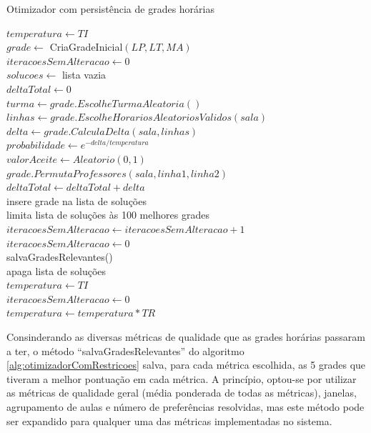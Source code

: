 \begin{algorithm}
	\caption{Otimizador com persistência de grades horárias}
	\label{alg:otimizadorComRestricoes}
	$temperatura \leftarrow TI$\\
	$grade \leftarrow$ CriaGradeInicial$(LP, LT, MA)$\\
	$iteracoesSemAlteracao \leftarrow 0$\\
	$solucoes \leftarrow$ lista vazia\\
	 {
		$deltaTotal \leftarrow 0$\\
		 {
			$turma \leftarrow grade.EscolheTurmaAleatoria()$\\
			$linhas \leftarrow grade.EscolheHorariosAleatoriosValidos(sala)$\\
			$delta \leftarrow grade.CalculaDelta(sala, linhas)$\\
			$probabilidade \leftarrow e^{-delta/temperatura}$\\
			$valorAceite \leftarrow Aleatorio(0, 1)$\\
			 {
				$grade.PermutaProfessores(sala, linha1, linha2)$\\
				$deltaTotal \leftarrow deltaTotal + delta$\\
				 {
					insere grade na lista de soluções\\
					limita lista de soluções às 100 melhores grades\\
				}
			}
		}
		 {
			$iteracoesSemAlteracao \leftarrow iteracoesSemAlteracao + 1$\\
		}{
			$iteracoesSemAlteracao \leftarrow 0$\\
		}
		 {
			salvaGradesRelevantes()\\
			apaga lista de soluções\\
			$temperatura \leftarrow TI$\\
			$iteracoesSemAlteracao \leftarrow 0$\\
		}
		$temperatura \leftarrow temperatura * TR$
	}
\end{algorithm}
\pagebreak

Consinderando as diversas métricas de qualidade que as grades horárias passaram a ter, o método ``salvaGradesRelevantes'' do algoritmo \ref{alg:otimizadorComRestricoes} salva, para cada métrica escolhida, as 5 grades que tiveram a melhor pontuação em cada métrica. A princípio, optou-se por utilizar as métricas de qualidade geral (média ponderada de todas as métricas), janelas, agrupamento de aulas e número de preferências resolvidas, mas este método pode ser expandido para qualquer uma das métricas implementadas no sistema.

